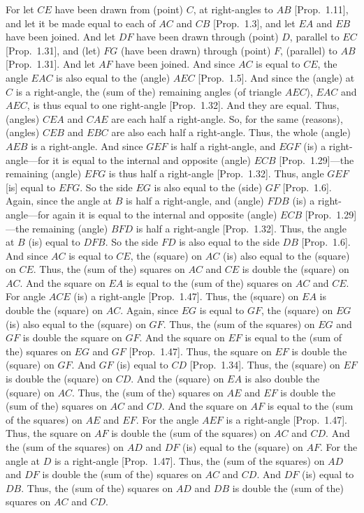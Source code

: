 For let $CE$ have been drawn from (point) $C$, at right-angles to $AB$ [Prop.~1.11], and let it be made equal to each of $AC$ and $CB$ [Prop.~1.3],
and let $EA$ and $EB$ have been joined. And let $DF$ have been drawn through
(point) $D$, parallel to $EC$ [Prop.~1.31], and (let) $FG$ (have been drawn)
through (point) $F$, (parallel) to $AB$ [Prop.~1.31]. And let $AF$ have been joined.
And since $AC$ is equal to $CE$,  the angle $EAC$ is also equal to the (angle) $AEC$ [Prop.~1.5]. And since the (angle) at $C$ is a right-angle, the (sum of the) remaining angles
(of triangle $AEC$), $EAC$ and $AEC$, is thus equal to one right-angle [Prop.~1.32].
And they are equal. Thus, (angles) $CEA$ and $CAE$ are each half a right-angle.
So, for the same (reasons), (angles) $CEB$ and $EBC$ are also each half a
right-angle. Thus, the whole (angle) $AEB$ is a right-angle. And since
$GEF$ is half a right-angle, and $EGF$ (is) a right-angle---for it is
equal to the internal and opposite  (angle) $ECB$ [Prop.~1.29]---the remaining (angle) $EFG$ is thus
half a right-angle [Prop.~1.32]. Thus, angle $GEF$ [is] equal to $EFG$.
So the side $EG$ is also equal to the (side) $GF$ [Prop.~1.6]. Again, since the angle
at $B$ is half a right-angle, and (angle) $FDB$ (is) a right-angle---for again
it is equal to the internal and opposite  (angle) $ECB$ [Prop.~1.29]---the
remaining (angle) $BFD$ is half a right-angle [Prop.~1.32]. Thus, the angle
at $B$ (is) equal to $DFB$. So the side $FD$ is also equal to the side $DB$ [Prop.~1.6]. And since $AC$ is equal to $CE$,  the (square) on $AC$ (is) also equal to the (square) on $CE$. Thus, the (sum of the) squares on $AC$ and $CE$
is double the (square) on $AC$. And the square on $EA$ is equal to the (sum
of the) squares on $AC$ and $CE$. For angle $ACE$ (is) 
a right-angle [Prop.~1.47].
Thus, the (square) on $EA$ is double the (square) on $AC$. Again,  since
$EG$ is equal to $GF$, the (square) on $EG$ (is) also equal  to 
the (square) on $GF$. 
Thus, the (sum of the squares)
on $EG$ and $GF$ is double the square on $GF$.
And the square on $EF$ is equal to the (sum of the) squares on $EG$ and $GF$
[Prop.~1.47]. Thus, the square on $EF$ is double the (square) on $GF$.
And $GF$ (is) equal to $CD$ [Prop.~1.34]. Thus, the (square) on $EF$ is double the
(square) on $CD$. And the (square) on $EA$ is also double the (square) on $AC$.
Thus, the (sum of the) squares on $AE$ and $EF$ is double the (sum of the)
squares on $AC$ and $CD$. And the square on $AF$ is equal to the
(sum of the squares) on $AE$ and $EF$. For the angle $AEF$ is a right-angle [Prop.~1.47]. Thus, the square on $AF$ is double the (sum of the squares) on 
$AC$ and $CD$. And the (sum of the squares) on $AD$ and $DF$ (is) equal to
the (square) on $AF$. For the angle at $D$ is a right-angle [Prop.~1.47].
Thus, the (sum of the squares) on $AD$ and $DF$ is double the (sum of the)
squares on $AC$ and $CD$. And $DF$ (is) equal to $DB$. Thus, the
(sum of the) squares on $AD$ and $DB$ is double the (sum of the) squares on
$AC$ and $CD$.

